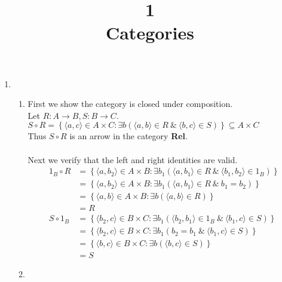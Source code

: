 \documentclass{article} %
\title{\textbf{1}\\Categories}
\newcommand{\set}[1]{\left\{#1\right\}}
\newcommand{\pair}[1]{\langle#1\rangle}
\begin{document}
\maketitle
\begin{enumerate}
	\item \begin{enumerate}
        \item First we show the category is closed under composition.
        \\Let $R:A \rightarrow B, S:B \rightarrow C$.
        \\$S \circ R = 
        \set{ \pair{a,c} \in A \times C : \exists b (\pair{a,b} \in R \:\&\: \pair{b,c} \in S)} \subseteq 
        A \times C$
        \\Thus $S \circ R$ is an arrow in the category \textbf{Rel}.
        \\
        \\ Next we verify that the left and right identities are valid.
        \begin{align*}
            1_B \circ R &= \set{ \pair{a,b_2} \in A \times B : \exists b_1 (\pair{a,b_1} \in R \:\&\: \pair{b_1,b_2} \in 1_B)}
            \\&=\set{ \pair{a,b_2} \in A \times B : \exists b_1 (\pair{a,b_1} \in R \:\&\: b_1=b_2)}
            \\&=\set{ \pair{a,b} \in A \times B : \exists b (\pair{a,b} \in R)}
            \\&=R
            \\S \circ 1_B &= \set{ \pair{b_2,c} \in B \times C : \exists b_1 (\pair{b_2,b_1} \in 1_B \:\&\: \pair{b_1,c} \in S)}
            \\&=\set{ \pair{b_2,c} \in B \times C : \exists b_1 (b_2=b_1 \:\&\: \pair{b_1,c} \in S)}
            \\&=\set{ \pair{b,c} \in B \times C : \exists b (\pair{b,c} \in S)}
            \\&=S
        \end{align*}
        \item 
    \end{enumerate}
\end{enumerate}
\end{document}
